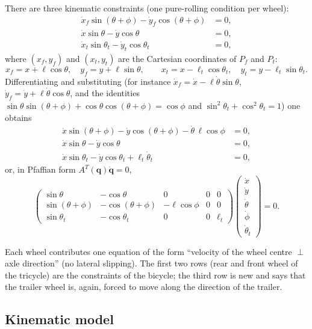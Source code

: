 \documentclass[11pt,a4paper]{article}
\theoremstyle{definition}
\theoremstyle{plain}
\newcommand{\qv}{\bm{q}}
\begin{document}
There are three kinematic constraints (one pure-rolling condition per wheel):
\begin{align*}
 \dot x_f\sin(\theta+\phi)-\dot y_f\cos(\theta+\phi)&=0,\\
 \dot x\sin\theta-\dot y\cos\theta&=0,\\
 \dot x_t\sin\theta_t-\dot y_t\cos\theta_t&=0,
\end{align*}
where $(x_f,y_f)$ and $(x_t,y_t)$ are the Cartesian coordinates of $P_f$ and $P_t$:
\[
 x_f=x+\ell\cos\theta,\quad y_f=y+\ell\sin\theta,\qquad
 x_t=x-\ell_t\cos\theta_t,\quad y_t=y-\ell_t\sin\theta_t .
\]
Differentiating and substituting (for instance $\dot x_f=\dot x-\ell\dot\theta\sin\theta$, $\dot y_f=\dot y+\ell\dot\theta\cos\theta$, and the identities $\sin\theta\sin(\theta+\phi)+\cos\theta\cos(\theta+\phi)=\cos\phi$ and $\sin^2\theta_t+\cos^2\theta_t=1$) one obtains
\begin{align*}
 \dot x\sin(\theta+\phi)-\dot y\cos(\theta+\phi)-\dot\theta\,\ell\cos\phi&=0,\\
 \dot x\sin\theta-\dot y\cos\theta&=0,\\
 \dot x\sin\theta_t-\dot y\cos\theta_t+\ell_t\dot\theta_t&=0,
\end{align*}
or, in Pfaffian form $A^T(\qv)\dot{\qv}=0$,
\[
 \begin{pmatrix}
  \sin\theta&-\cos\theta&0&0&0\\
  \sin(\theta+\phi)&-\cos(\theta+\phi)&-\ell\cos\phi&0&0\\
  \sin\theta_t&-\cos\theta_t&0&0&\ell_t
 \end{pmatrix}
 \begin{pmatrix}\dot x\\\dot y\\\dot\theta\\\dot\phi\\\dot\theta_t\end{pmatrix}=0 .
\]

\begin{intuition}
Each wheel contributes one equation of the form ``velocity of the wheel centre $\perp$ axle direction'' (no lateral slipping). The first two rows (rear and front wheel of the tricycle) are the constraints of the bicycle; the third row is new and says that the trailer wheel is, again, forced to move along the direction of the trailer.
\end{intuition}

\subsection{Kinematic model}
\end{document}
